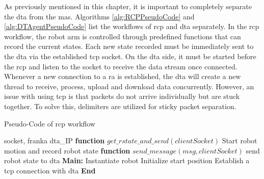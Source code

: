 As previously mentioned in this chapter, it is important to completely separate the 
\gls{dta} from the \gls{mas}. Algorithms \ref{alg:RCPPseudoCode} and 
\ref{alg:DTAgentPseudoCode} list the workflows of \gls{rcp} and \gls{dta} separately. 
In the \gls{rcp} workflow, the robot arm is controlled through predefined functions 
that can record the current states. Each new state recorded must be immediately sent 
to the \gls{dta} via the established \gls{tcp} socket. 
On the \gls{dta} side, it must be started before the \gls{rcp} and listen to the 
socket to receive the data stream once connected. Whenever a new connection to a 
\gls{ra} is established, the \gls{dta} will create a new thread to receive, process, 
upload and download data concurrently. 
However, an issue with using \gls{tcp} is that packets do not arrive individually 
but are stuck together. To solve this, delimiters are utilized for sticky packet separation.

\begin{breakablealgorithm}
    \caption{Pseudo-Code of \gls{rcp} workflow}
    \label{alg:RCPPseudoCode}
    \begin{algorithmic}
     socket, franka
     \gls{dta}\_IP
    \State \textbf{function} {$get\_rstate\_and\_send(clientSocket)$}
        \State \qquad Start robot motion and record robot state
        \State {}
    \State \textbf{function} {$send\_message(msg, clientSocket)$}
        \State \qquad send robot state to \gls{dta} 
    \State \textbf{Main:}
    \State \qquad Instantiate robot
    \State \qquad Initialize start position
    \State \qquad Establish a \gls{tcp} connection with \gls{dta}  
    \State {}
    \State \textbf{End}
    \end{algorithmic}
\end{breakablealgorithm}



